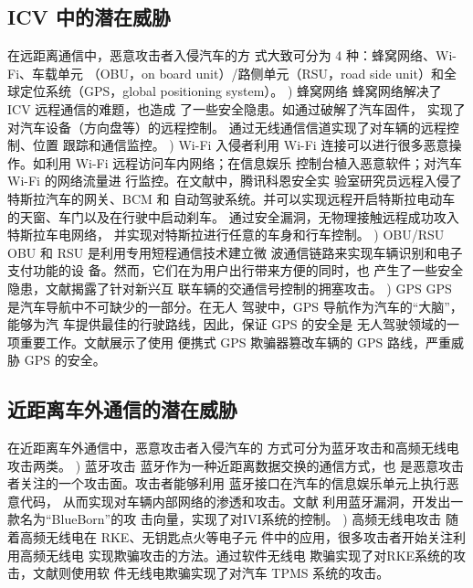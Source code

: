 \subsection{ICV 中的潜在威胁}
在远距离通信中，恶意攻击者入侵汽车的方
式大致可分为 4 种：蜂窝网络、Wi-Fi、车载单元
（OBU，on board unit）/路侧单元（RSU，road side
unit）和全球定位系统（GPS，global positioning
system）。
) 蜂窝网络
蜂窝网络解决了 ICV 远程通信的难题，也造成
了一些安全隐患。如通过破解了汽车固件，
实现了对汽车设备（方向盘等）的远程控制。
通过无线通信信道实现了对车辆的远程控制、位置
跟踪和通信监控。
) Wi-Fi
入侵者利用 Wi-Fi 连接可以进行很多恶意操
作。如利用 Wi-Fi 远程访问车内网络；在信息娱乐
控制台植入恶意软件；对汽车 Wi-Fi 的网络流量进
行监控。在文献\cite{keen}中，腾讯科恩安全实
验室研究员远程入侵了特斯拉汽车的网关、BCM 和
自动驾驶系统。并可以实现远程开启特斯拉电动车的天窗、车门以及在行驶中启动刹车。
通过安全漏洞，无物理接触远程成功攻入特斯拉车电网络，
并实现对特斯拉进行任意的车身和行车控制。
) OBU/RSU
OBU 和 RSU 是利用专用短程通信技术建立微
波通信链路来实现车辆识别和电子支付功能的设
备。然而，它们在为用户出行带来方便的同时，也
产生了一些安全隐患，文献\cite{yongsai}揭露了针对新兴互
联车辆的交通信号控制的拥塞攻击。
) GPS
GPS 是汽车导航中不可缺少的一部分。在无人
驾驶中，GPS 导航作为汽车的“大脑”，能够为汽
车提供最佳的行驶路线，因此，保证 GPS 的安全是
无人驾驶领域的一项重要工作。文献\cite{cuigai}展示了使用
便携式 GPS 欺骗器篡改车辆的 GPS 路线，严重威
胁 GPS 的安全。
\subsection{近距离车外通信的潜在威胁}
在近距离车外通信中，恶意攻击者入侵汽车的
方式可分为蓝牙攻击和高频无线电攻击两类。
) 蓝牙攻击
蓝牙作为一种近距离数据交换的通信方式，也
是恶意攻击者关注的一个攻击面。攻击者能够利用
蓝牙接口在汽车的信息娱乐单元上执行恶意代码，
从而实现对车辆内部网络的渗透和攻击。文献\cite{antian}
利用蓝牙漏洞，开发出一款名为“BlueBorn”的攻
击向量，实现了对IVI系统的控制。
) 高频无线电攻击
随着高频无线电在 RKE、无钥匙点火等电子元
件中的应用，很多攻击者开始关注利用高频无线电
实现欺骗攻击的方法。通过软件无线电
欺骗实现了对RKE系统的攻击，文献\cite{wuxiandian}则使用软
件无线电欺骗实现了对汽车 TPMS 系统的攻击。

